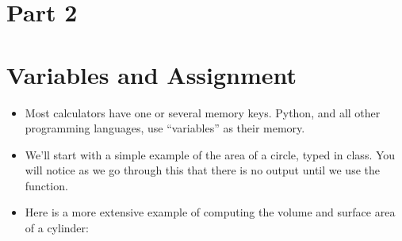 \documentclass[letterpaper,10pt,english]{sphinxmanual}
\begin{document}
\section{Part 2}
\label{\detokenize{lecture_notes/lec02_calculator:part-2}}

\section{Variables and Assignment}
\label{\detokenize{lecture_notes/lec02_calculator:variables-and-assignment}}\begin{itemize}
\item {} 
Most calculators have one or several memory keys. Python, and all
other programming languages, use “variables” as their memory.

\item {} 
We’ll start with a simple example of the area of a circle, typed in
class. You will notice as we go through this that there is no output
until we use the  function.

\item {} 
Here is a more extensive example of computing the volume and surface
area of a cylinder:

\begin{sphinxVerbatim}[commandchars=\\\{\}]
  
  
  
      
    
            
   
\end{sphinxVerbatim}


\end{itemize}
\end{document}
